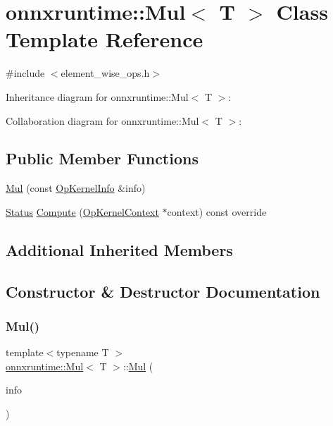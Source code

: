 \hypertarget{classonnxruntime_1_1Mul}{}\section{onnxruntime\+:\+:Mul$<$ T $>$ Class Template Reference}
\label{classonnxruntime_1_1Mul}


{\ttfamily \#include $<$element\+\_\+wise\+\_\+ops.\+h$>$}



Inheritance diagram for onnxruntime\+:\+:Mul$<$ T $>$\+:


Collaboration diagram for onnxruntime\+:\+:Mul$<$ T $>$\+:
\subsection*{Public Member Functions}
\begin{DoxyCompactItemize}
\item 
\mbox{\hyperlink{classonnxruntime_1_1Mul_a2ed63d20bbc75b7b4ec4fc0dbdab353d}{Mul}} (const \mbox{\hyperlink{classonnxruntime_1_1OpKernelInfo}{Op\+Kernel\+Info}} \&info)
\item 
\mbox{\hyperlink{classonnxruntime_1_1common_1_1Status}{Status}} \mbox{\hyperlink{classonnxruntime_1_1Mul_a96178c88e54c9fa23c2c50c3cf2f82c7}{Compute}} (\mbox{\hyperlink{classonnxruntime_1_1OpKernelContext}{Op\+Kernel\+Context}} $\ast$context) const override
\end{DoxyCompactItemize}
\subsection*{Additional Inherited Members}


\subsection{Constructor \& Destructor Documentation}
\mbox{\label{classonnxruntime_1_1Mul_a2ed63d20bbc75b7b4ec4fc0dbdab353d}} 
\subsubsection{\texorpdfstring{Mul()}{Mul()}}
{\footnotesize\ttfamily template$<$typename T $>$ \\
\mbox{\hyperlink{classonnxruntime_1_1Mul}{onnxruntime\+::\+Mul}}$<$ T $>$\+::\mbox{\hyperlink{classonnxruntime_1_1Mul}{Mul}} (\begin{DoxyParamCaption}\item[{const \mbox{\hyperlink{classonnxruntime_1_1OpKernelInfo}{Op\+Kernel\+Info}} \&}]{info }\end{DoxyParamCaption})\hspace{0.3cm}{\ttfamily [inline]}}



